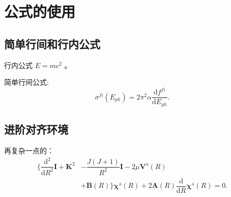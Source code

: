 
\chapter{公式的使用}




\section{简单行间和行内公式}



行内公式 $ E = mc^2 $ 。 

简单行间公式:
\begin{equation}
\sigma^{fi}({E_{ph}}) = 2{\pi ^2}\alpha \frac{{\mathrm{d}f^{fi}}}{{\mathrm{d}{E_{ph}}}}.
\label{eq:crsec1}
\end{equation}


\section{进阶对齐环境}


再复杂一点的：
\begin{equation}
    \begin{aligned}
        \bigg\{\dfrac{\mathrm{d}^{2}}{\mathrm{d} R^{2}} \mathbf{I} +   \mathbf{K}^{2} &- \dfrac{J(J+1)}{R^{2}} \mathbf{I}-2 \mu \mathbf{V}^{\mathrm{a}}(R)  
        \\ & +  \mathbf{B}(R)\bigg\} \bm{\chi}^{\mathrm{a}}(R) + 2 \mathbf{A}(R) \dfrac{\mathrm{d}}{\mathrm{d} R} \bm{\chi}^{\mathrm{a}}(R)=0.
    \end{aligned}
    \label{eq:adiseq}
\end{equation}



 

    
